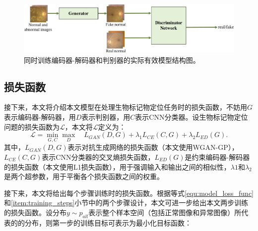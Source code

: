 \begin{figure}[h]
	\centering
	\includegraphics[width=1.0\textwidth]{figure/u_d_architecture.png}
	\caption{同时训练编码器-解码器和判别器的实际有效模型结构图。}
	\label{fig:u_d_architecture}
\end{figure}
\subsection{损失函数}\label{subsec:loss_func}
接下来，本文将介绍本文模型在处理生物标记物定位任务时的损失函数，不妨用$G$表示编码器-解码器，用$D$表示判别器，用$C$表示CNN分类器。设生物标记物定位问题的损失函数为$\mathcal{L}$，本文将$\mathcal{L}$定义为：
\begin{equation}\label{equ:model_loss_func}
\mathcal{L}=\min _{G, C} \max _{D} \quad L_{GAN}(D, G)+\lambda_{1} L_{C E}(C, G)+\lambda_{2} L_{E D}(G).
\end{equation}
其中，$L_{GAN}(D, G)$表示对抗生成网络的损失函数（本文使用WGAN-GP），$L_{CE}(C, G)$表示CNN分类器的交叉熵损失函数，$L_{E D}(G)$是约束编码器-解码器的损失函数（本文使用L1损失函数），用于强调输入和输出之间的相似性，$\lambda{1}$和$\lambda_{2}$是两个超参数，用于平衡各个损失函数之间的权重。

接下来，本文将给出每个步骤训练时的损失函数。根据等式\ref{equ:model_loss_func}和\ref{item:training_steps}小节中的两个步骤设计，本文可进一步给出本文两步训练的损失函数。设分布$y\sim p_{all}$表示整个样本空间（包括正常图像和异常图像）所代表的的分布，则第一步的训练目标可表示为最小化目标函数：

